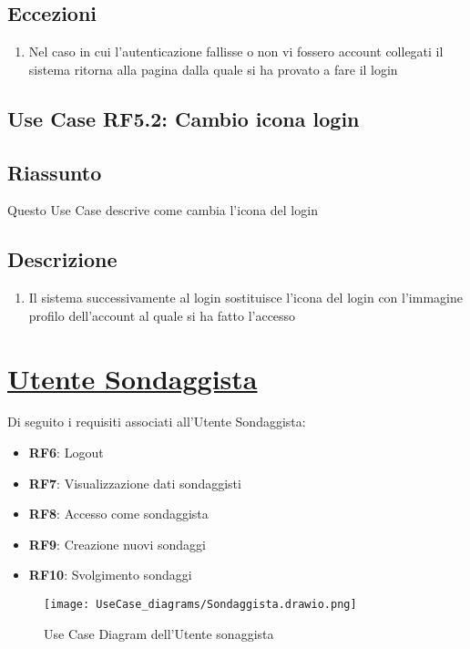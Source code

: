         \subsection{Eccezioni}
            \begin{enumerate}
                \item Nel caso in cui l'autenticazione fallisse o non vi fossero account collegati il sistema ritorna alla pagina dalla quale si ha provato a fare il login
            \end{enumerate}

    \subsection{Use Case RF5.2: Cambio icona login}
        \subsection{Riassunto}
            Questo Use Case descrive come cambia l'icona del login
        \subsection{Descrizione}
            \begin{enumerate}
                \item Il sistema successivamente al login sostituisce l'icona del login con l'immagine profilo dell'account al quale si ha fatto l'accesso
            \end{enumerate}

\section{\underline{Utente Sondaggista}}
    Di seguito i requisiti associati all'Utente Sondaggista:
    \begin{itemize}
        \item \textbf{RF6}: Logout
        \item \textbf{RF7}: Visualizzazione dati sondaggisti
        \item \textbf{RF8}: Accesso come sondaggista
        \item \textbf{RF9}: Creazione nuovi sondaggi
        \item \textbf{RF10}: Svolgimento sondaggi
    \end{itemize}
    \begin{figure}[H]
        \centering
        \texttt{[image: UseCase\_diagrams/Sondaggista.drawio.png]}
        \caption{Use Case Diagram dell'Utente sonaggista}
    \end{figure}
